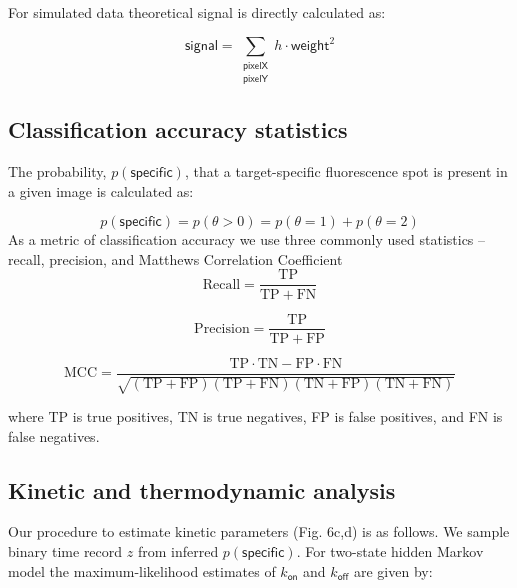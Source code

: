 For simulated data theoretical signal is directly calculated as:

\begin{equation}
    \mathsf{signal} =  \sum_{\substack{\mathsf{pixelX} \\ \mathsf{pixelY}}} h \cdot \mathsf{weight}^2
\end{equation}

\subsection*{Classification accuracy statistics}
The probability, $p(\mathsf{specific})$, that a target-specific fluorescence spot is present in a given image is calculated as:

\begin{equation}
    p(\mathsf{specific}) = p(\theta > 0) = p(\theta = 1) + p(\theta = 2)
\end{equation}
As a metric of classification accuracy we use three commonly used statistics -- recall, precision, and Matthews Correlation Coefficient \cite{Matthews1975-rw}
\begin{equation}
    \mathrm{Recall} = \dfrac{\mathrm{TP}}{\mathrm{TP} + \mathrm{FN}}
\end{equation}

\begin{equation}
    \mathrm{Precision} = \dfrac{\mathrm{TP}}{\mathrm{TP} + \mathrm{FP}}
\end{equation}

\begin{equation}
    \mathrm{MCC} =
        \dfrac{\mathrm{TP} \cdot \mathrm{TN} - \mathrm{FP} \cdot \mathrm{FN}}
        {\sqrt{(\mathrm{TP} + \mathrm{FP}) (\mathrm{TP} + \mathrm{FN}) (\mathrm{TN} + \mathrm{FP}) (\mathrm{TN} + \mathrm{FN})}}
\end{equation}

\noindent
where TP is true positives, TN is true negatives, FP is false positives, and FN is false negatives.

\subsection*{Kinetic and thermodynamic analysis}

Our procedure to estimate kinetic parameters (Fig. 6c,d) is as follows. We sample binary time record $z$ from inferred $p(\mathsf{specific})$. For two-state hidden Markov model the maximum-likelihood estimates of $k_\mathsf{on}$ and $k_\mathsf{off}$ are given by:


